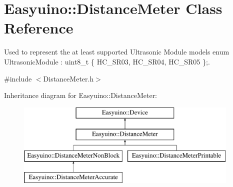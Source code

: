 \hypertarget{class_easyuino_1_1_distance_meter}{}\section{Easyuino\+:\+:Distance\+Meter Class Reference}
\label{class_easyuino_1_1_distance_meter}


Used to represent the at least supported Ultrasonic Module models enum Ultrasonic\+Module \+: uint8\+\_\+t \{ H\+C\+\_\+\+S\+R03, H\+C\+\_\+\+S\+R04, H\+C\+\_\+\+S\+R05 \};.  




{\ttfamily \#include $<$Distance\+Meter.\+h$>$}

Inheritance diagram for Easyuino\+:\+:Distance\+Meter\+:\begin{figure}[H]
\begin{center}
\leavevmode
\includegraphics[height=4.000000cm]{class_easyuino_1_1_distance_meter}
\end{center}
\end{figure}
